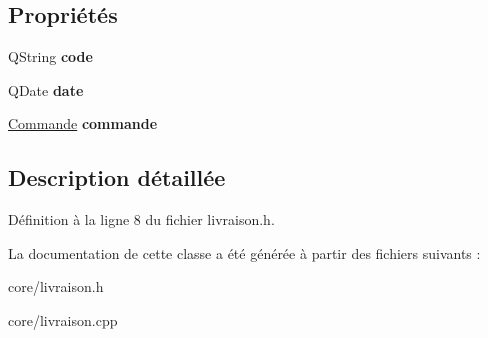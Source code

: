 \subsection*{Propriétés}
\begin{DoxyCompactItemize}
\item 
\hypertarget{class_core_1_1_livraison_a05faa701617f0d602f3c3ecdcfebba9d}{
QString {\bfseries code}}
\label{df/d27/class_core_1_1_livraison_a05faa701617f0d602f3c3ecdcfebba9d}

\item 
\hypertarget{class_core_1_1_livraison_a0ecb446fad5ddf4f46c079a6b1dea5be}{
QDate {\bfseries date}}
\label{df/d27/class_core_1_1_livraison_a0ecb446fad5ddf4f46c079a6b1dea5be}

\item 
\hypertarget{class_core_1_1_livraison_a29e340b05d4914fa9bff496219e932ac}{
\hyperlink{class_core_1_1_commande}{Commande} {\bfseries commande}}
\label{df/d27/class_core_1_1_livraison_a29e340b05d4914fa9bff496219e932ac}

\end{DoxyCompactItemize}


\subsection{Description détaillée}


Définition à la ligne 8 du fichier livraison.h.



La documentation de cette classe a été générée à partir des fichiers suivants :\begin{DoxyCompactItemize}
\item 
core/livraison.h\item 
core/livraison.cpp\end{DoxyCompactItemize}
